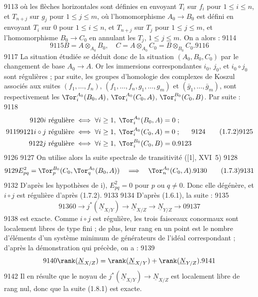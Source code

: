   9113	o\`u les fl\`eches horizontales sont d\'efinies en envoyant $T_i$ sur $f_i$ pour $1 \leq i \leq n$, et $T_{n+j}$ sur $g_j$ pour $1 \leq j \leq m$, o\`u l'homomorphisme $A_0 \to B_0$ est d\'efini en envoyant $T_i$ sur $0$ pour $1 \leq i \leq n$, et $T_{n+j}$ sur $T_j$ pour $1 \leq j \leq m$, et l'homomorphisme $B_0 \to C_0$ en annulant les $T_j$, $1 \leq j \leq m$. On a alors :
  9114	\[
  9115	B = A \otimes_{A_0} B_0, \quad C = A \otimes_{A_0} C_0 = B \otimes_{B_0} C_0.
  9116	\]
  9117	La situation \'etudi\'ee se d\'eduit donc de la situation $(A_0, B_0, C_0)$ par le changement de base $A_0 \to A$. Or les immersions correspondantes $i_0$, $j_0$, et $i_0 \circ j_0$ sont r\'eguli\`eres ; par suite, les groupes d'homologie des complexes de Koszul associ\'es aux suites $(f_1,\dots,f_n)$, $(f_1,\dots,f_n,g_1,\dots,g_m)$ et $(\bar{g}_1,\dots,\bar{g}_m)$, sont respectivement les $\Tor_i^{A_0}(B_0, A)$, $\Tor_i^{A_0}(C_0, A)$, $\Tor_i^{B_0}(C_0, B)$. Par suite :
  9118	\[
  9119	\begin{aligned}
  9120	i \text{ r\'eguli\`ere} &\iff \forall i \geq 1, \; \Tor_i^{A_0}(B_0, A) = 0 \; ; \\
  9121	i \circ j \text{ r\'eguli\`ere} &\iff \forall i \geq 1, \; \Tor_i^{A_0}(C_0, A) = 0 \; ; \\
  9122	j \text{ r\'eguli\`ere} &\iff \forall i \geq 1, \; \Tor_i^{B_0}(C_0, B) = 0.
  9123	\end{aligned}
  9124	\tag{1.7.2}
  9125	\]
  9126	
  9127	On utilise alors la suite spectrale de transitivit\'e ([1], XVI~5)
  9128	\[
  9129	E^2_{pq} = \Tor_p^{B_0}(C_0, \Tor_q^{A_0}(B_0, A)) \quad \Longrightarrow \quad \Tor_n^{A_0}(C_0, A).
  9130	\tag{1.7.3}
  9131	\]
  9132	D'apr\`es les hypoth\`eses de i), $E^2_{pq} = 0$ pour $p$ ou $q \neq 0$. Donc elle d\'eg\'en\`ere, et $i \circ j$ est r\'eguli\`ere d'apr\`es (1.7.2).
  9133	
  9134	D'apr\`es (1.6.1), la suite :
  9135	\[
  9136	0 \longrightarrow j^{*}(\underline{N}_{X/Y}) \longrightarrow \underline{N}_{X/Z} \longrightarrow \underline{N}_{Y/Z} \longrightarrow 0
  9137	\]
  9138	est exacte. Comme $i \circ j$ est r\'eguli\`ere, les trois faisceaux conormaux sont localement libres de type fini ; de plus, leur rang en un point est le nombre d'\'el\'ements d'un syst\`eme minimum de g\'en\'erateurs de l'id\'eal correspondant ; d'apr\`es la d\'emonstration qui pr\'ec\`ede, on a :
  9139	\[
  9140	\rank(\underline{N}_{X/Z}) = \rank(\underline{N}_{X/Y}) + \rank(\underline{N}_{Y/Z}).
  9141	\]
  9142	Il en r\'esulte que le noyau de $j^{*}(\underline{N}_{X/Y}) \to \underline{N}_{X/Z}$ est localement libre de rang nul, donc que la suite (1.8.1) est exacte.
